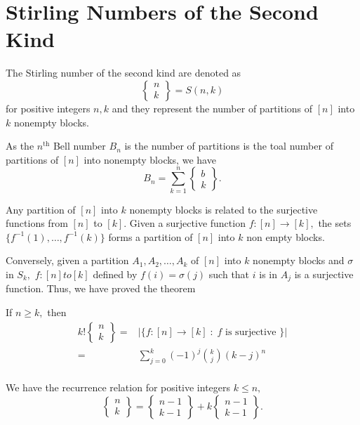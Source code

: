 \section{Stirling Numbers of the Second Kind}

\begin{definition}
	The Stirling number of the second kind are denoted as 
	$$ \begin{Bmatrix} n\\k \end{Bmatrix} = S(n,k)$$
	for positive integers $n,k$ and they represent the
	number of partitions of $[n]$ into $k$ nonempty blocks.
\end{definition}


\begin{remark}
	As the $n^\text{th}$ Bell number $B_n$ is the number of partitions is the toal number of partitions of $[n]$ into nonempty blocks, we have
	$$B_n = \sum_{k=1}^{n} \begin{Bmatrix} b\\k\end{Bmatrix}.$$ 
\end{remark}



Any partition of $[n]$ into $k$ nonempty blocks is related to the
surjective functions from $[n]$ to $[k].$ Given a surjective function
$f \colon [n] \to [k],$ the sets $\{ f^{-1}(1), \dotsc, f^{-1}(k)\}$
forms a partition of $[n]$ into $k$ non empty blocks.

Conversely, given a partition $A_1, A_2, \dotsc, A_k$ of $[n]$ into $k$ nonempty blocks and $\sigma$ in $S_k,$ $f \colon [n] to [k]$ defined by
$f(i) = \sigma(j)$ such that $i$ is in $A_{j}$ is a surjective function.
Thus, we have proved the theorem
\begin{theorem}
	If $n \geq k,$ then 
	\begin{align*}
		k! \begin{Bmatrix} n\\k\end{Bmatrix}
		={}& \lvert \{ f\colon [n] \to [k] \; : \;
		f \text{ is surjective } \} \rvert \\
		={}& \sum_{j=0}^{k} (-1)^j \binom{k}{j} (k-j)^n\\
	\end{align*}
\end{theorem}


\begin{remark}
	We have the recurrence relation for positive integers $k \leq n,$
	$$ \begin{Bmatrix} n\\k\end{Bmatrix} = 
	\begin{Bmatrix}n-1\\k-1 \end{Bmatrix} + 
	k \begin{Bmatrix}n-1\\k-1 \end{Bmatrix}. $$
\end{remark}


